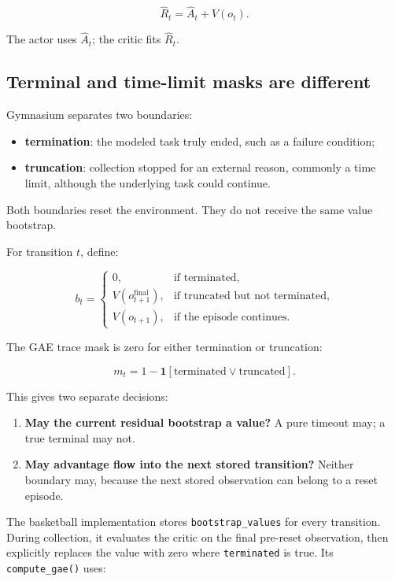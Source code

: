 \documentclass[
  american,
  11pt,
  letterpaper,
]{article}
\providecommand{\tightlist}{%
  \setlength{\itemsep}{0pt}\setlength{\parskip}{0pt}}
\begin{document}
\[
\widehat R_t=\widehat A_t+V(o_t).
\]

The actor uses \(\widehat A_t\); the critic fits \(\widehat R_t\).

\subsection{Terminal and time-limit masks are
different}\label{terminal-and-time-limit-masks-are-different}

Gymnasium separates two boundaries:

\begin{itemize}
\tightlist
\item
  \textbf{termination}: the modeled task truly ended, such as a failure
  condition;
\item
  \textbf{truncation}: collection stopped for an external reason,
  commonly a time limit, although the underlying task could continue.
\end{itemize}

Both boundaries reset the environment. They do not receive the same
value bootstrap.

For transition \(t\), define:

\[
b_t=
\begin{cases}
0,&\text{if terminated},\\
V(o_{t+1}^{\mathrm{final}}),&\text{if truncated but not terminated},\\
V(o_{t+1}),&\text{if the episode continues}.
\end{cases}
\]

The GAE trace mask is zero for either termination or truncation:

\[
m_t=1-\mathbf 1[\text{terminated}\lor\text{truncated}].
\]

This gives two separate decisions:

\begin{enumerate}
\def\labelenumi{\arabic{enumi}.}
\tightlist
\item
  \textbf{May the current residual bootstrap a value?} A pure timeout
  may; a true terminal may not.
\item
  \textbf{May advantage flow into the next stored transition?} Neither
  boundary may, because the next stored observation can belong to a
  reset episode.
\end{enumerate}

The basketball implementation stores
\texttt{bootstra\allowbreak{}p\_\allowbreak{}values} for every
transition. During collection, it evaluates the critic on the final
pre-reset observation, then explicitly replaces the value with zero
where \texttt{terminated} is true. Its \texttt{compute\_gae()} uses:
\end{document}
